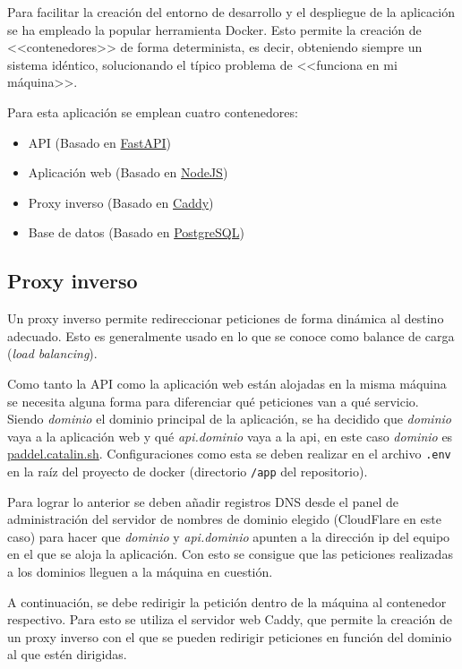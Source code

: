 Para facilitar la creación del entorno de desarrollo y el despliegue de la
aplicación se ha empleado la popular herramienta Docker. Esto permite la
creación de <<contenedores>> de forma determinista, es decir, obteniendo siempre
un sistema idéntico, solucionando el típico problema de <<funciona en mi
máquina>>.

Para esta aplicación se emplean cuatro contenedores:

\begin{itemize}
    \item API (Basado en \href{https://fastapi.tiangolo.com/}{FastAPI})
    \item Aplicación web (Basado en \href{https://nodejs.org/en}{NodeJS})
    \item Proxy inverso (Basado en \href{https://caddyserver.com/}{Caddy})
    \item Base de datos (Basado en \href{https://www.postgresql.org/}{PostgreSQL})
\end{itemize}

\subsection{Proxy inverso}

Un proxy inverso permite redireccionar peticiones de forma dinámica al destino
adecuado. Esto es generalmente usado en lo que se conoce como balance de carga
(\textit{load balancing}).

Como tanto la API como la aplicación web están alojadas en la misma máquina se
necesita alguna forma para diferenciar qué peticiones van a qué servicio. Siendo
\textit{dominio} el dominio principal de la aplicación, se ha decidido que
\textit{dominio} vaya a la aplicación web y qué \textit{api.dominio} vaya a la
api, en este caso \textit{dominio} es
\href{https://paddel.catalin.sh}{paddel.catalin.sh}. Configuraciones como esta
se deben realizar en el archivo \texttt{.env} en la raíz del proyecto de docker
(directorio \texttt{/app} del repositorio).

Para lograr lo anterior se deben añadir registros DNS desde el panel de
administración del servidor de nombres de dominio elegido (CloudFlare en este
caso) para hacer que \textit{dominio} y \textit{api.dominio} apunten a la
dirección ip del equipo en el que se aloja la aplicación. Con esto se consigue
que las peticiones realizadas a los dominios lleguen a la máquina en cuestión.

A continuación, se debe redirigir la petición dentro de la máquina al contenedor
respectivo. Para esto se utiliza el servidor web Caddy, que permite la creación
de un proxy inverso con el que se pueden redirigir peticiones en función del
dominio al que estén dirigidas.

